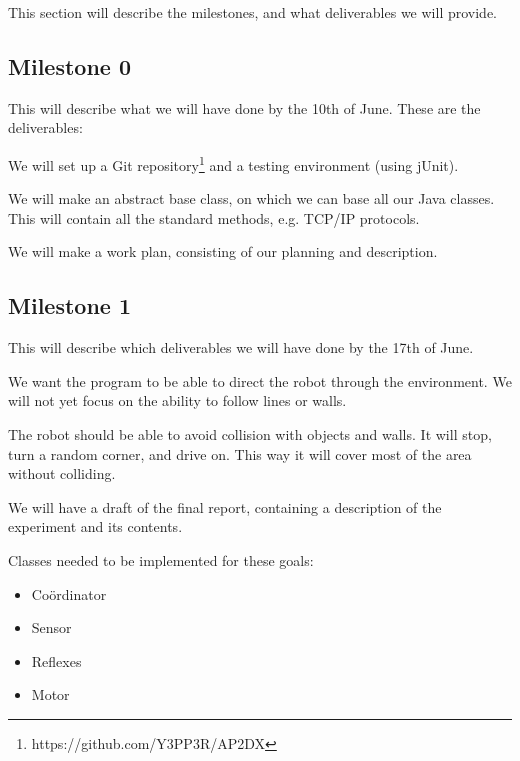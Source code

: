 This section will describe the milestones, and what deliverables we will provide. 

\subsection*{Milestone 0}
This will describe what we will have done by the 10th of June. These are the
deliverables:
\begin{description}
\small
\item[Working environment:] We will set up a Git
repository\footnote{https://github.com/Y3PP3R/AP2DX} and a testing environment
(using jUnit).
\item[Base class:] We will make an abstract base class, on which we can base
all our Java classes. This will contain all the standard methods, e.g. TCP/IP
protocols.
\item[Work plan:] We will make a work plan, consisting of our planning and
description.
\end{description}

\subsection*{Milestone 1}
This will describe which deliverables we will have done by the 17th of June.
\begin{description}
\small
\item[Drive:] We want the program to be able to direct
the robot through the environment. We will not yet focus on the ability to
follow lines or walls.
\item[Avoid collision:] The robot should be able to avoid collision with objects
and walls. It will stop, turn a random corner, and drive on. This way it will
cover most of the area without colliding. 
\item[Experiment and content of final report:] We will have a draft of the final
report, containing a description of the experiment and its contents.
\end{description}

Classes needed to be implemented for these goals:
\begin{itemize}
\item Co\"ordinator
\item Sensor
\item Reflexes
\item Motor
\end{itemize}

